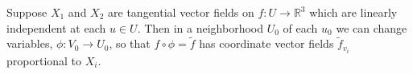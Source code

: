 Suppose $X_1$ and $X_2$ are tangential vector fields on $f: U \to \mathbb{R}^3$ which are linearly independent at each $u \in U$. Then in a neighborhood $U_0$ of each $u_0$ we can change variables, $\phi: V_0 \to U_0$, so that $f \circ \phi = \tilde{f}$ has coordinate vector fields $\tilde{f}_{v_i}$ proportional to $X_i$.

